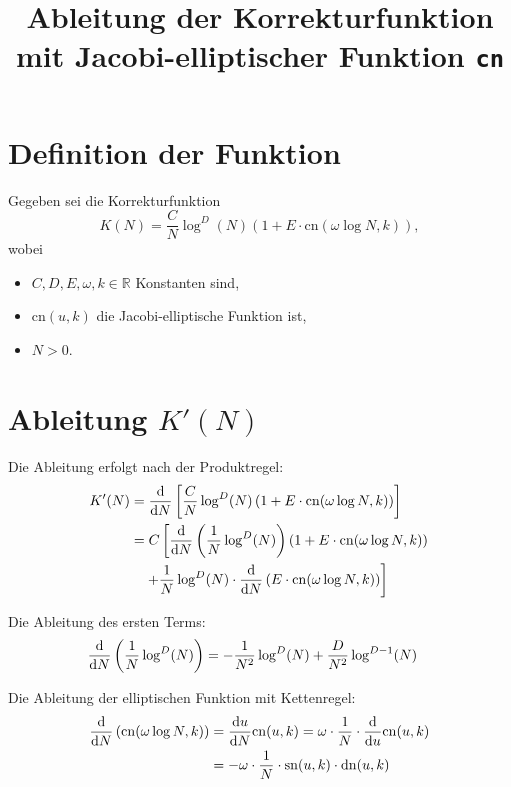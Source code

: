 \documentclass[a4paper,12pt]{article}
\title{Ableitung der Korrekturfunktion mit Jacobi-elliptischer Funktion \texttt{cn}}
\author{}
\date{}
\begin{document}
\maketitle

\section*{Definition der Funktion}

Gegeben sei die Korrekturfunktion
\begin{equation}
K(N) = \frac{C}{N} \log^D(N) \left( 1 + E \cdot \mathrm{cn}(\omega \log N, k) \right),
\end{equation}
wobei
\begin{itemize}
  \item \( C, D, E, \omega, k \in \mathbb{R} \) Konstanten sind,
  \item \( \mathrm{cn}(u, k) \) die Jacobi-elliptische Funktion ist,
  \item \( N > 0 \).
\end{itemize}

\section*{Ableitung \( K'(N) \)}

Die Ableitung erfolgt nach der Produktregel:
\begin{align}
K'(N) &= \dv{N} \left[ \frac{C}{N} \log^D(N) \left( 1 + E \cdot \mathrm{cn}(\omega \log N, k) \right) \right] \\
&= C \left[ \dv{N} \left( \frac{1}{N} \log^D(N) \right) \left( 1 + E \cdot \mathrm{cn}(\omega \log N, k) \right) \right. \notag\\
&\quad\left. + \frac{1}{N} \log^D(N) \cdot \dv{N} \left( E \cdot \mathrm{cn}(\omega \log N, k) \right) \right]
\end{align}

Die Ableitung des ersten Terms:
\begin{align}
\dv{N} \left( \frac{1}{N} \log^D(N) \right)
&= -\frac{1}{N^2} \log^D(N) + \frac{D}{N^2} \log^{D-1}(N)
\end{align}

Die Ableitung der elliptischen Funktion mit Kettenregel:
\begin{align}
\dv{N} \left( \mathrm{cn}(\omega \log N, k) \right)
&= \dv{u}{N} \mathrm{cn}(u, k) = \omega \cdot \frac{1}{N} \cdot \dv{u} \mathrm{cn}(u, k) \\
&= -\omega \cdot \frac{1}{N} \cdot \mathrm{sn}(u, k) \cdot \mathrm{dn}(u, k)
\end{align}
\end{document}
